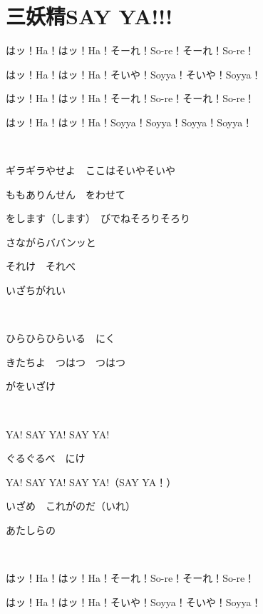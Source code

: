 \section{三妖精SAY YA!!!}

はッ！Ha！はッ！Ha！そーれ！So-re！そーれ！So-re！

はッ！Ha！はッ！Ha！そいや！Soyya！そいや！Soyya！

はッ！Ha！はッ！Ha！そーれ！So-re！そーれ！So-re！

はッ！Ha！はッ！Ha！Soyya！Soyya！Soyya！Soyya！

~

ギラギラやせよ　ここはそいやそいや

ももありんせん　をわせて

をします（します）　びでねそろりそろり

さながらババンッと

それけ　それべ

いざちがれい

~

ひらひらひらいる　にく

きたちよ　つはつ　つはつ

がをいざけ

~

YA! SAY YA! SAY YA!

ぐるぐるべ　にけ

YA! SAY YA! SAY YA!（SAY YA！）

いざめ　これがのだ（いれ）

あたしらの

~

はッ！Ha！はッ！Ha！そーれ！So-re！そーれ！So-re！

はッ！Ha！はッ！Ha！そいや！Soyya！そいや！Soyya！

